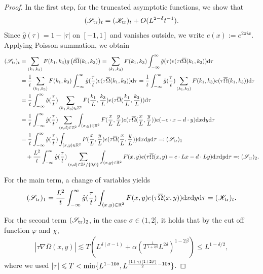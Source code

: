 \documentclass[UTF-8,reqno]{amsart}
\numberwithin{equation}{section}
\theoremstyle{definition}
\def\dif{{\mathord{{\rm d}}}}
\def\min{{\mathord{{\rm min}}}}
\def\leq{\leqslant}
\def\dif{{\mathord{{\rm d}}}}
\def\min{{\mathord{{\rm min}}}}
\def\leq{\leqslant}
\begin{document}
\begin{proof}
In the first step,  for  the truncated asymptotic functions, we show that $$
( \mathscr S_{\rm tr})_t= (\mathscr K_{\rm tr})_t +O(L^{2-\delta} t^{-1}).
$$
Since $\widehat g(\tau)=1-|\tau|$ on $[-1,1]$ and vanishes outside, we write $e(x):=e^{2\pi i x}$. Applying Poisson summation, we obtain 
\begin{align*}
 (  \mathscr S_{\rm tr})_t&=\sum_{(k_1, k_3)}F(k_1,k_3) g\left(t\overline \Omega(k_1,k_3)\right)=\sum_{(k_1, k_3)}F(k_1,k_3)\int_{-\infty}^{\infty}\hat{g}(\tau)e(\tau t\overline \Omega(k_1,k_3))\dif \tau\\
 &=\frac1t \sum_{(k_1, k_3)}F(k_1,k_3)\int_{-\infty}^{\infty}\hat{g}(\frac\tau t)e(\tau \overline \Omega(k_1,k_3))\dif \tau=\frac1t \int_{-\infty}^{\infty}\hat{g}(\frac\tau t)\sum_{(k_1, k_3)}F(k_1,k_3)e(\tau \overline \Omega(k_1,k_3))\dif \tau\\
 &=\frac1t \int_{-\infty}^{\infty}\hat{g}(\frac\tau t)\sum_{(k_1, k_3)\in\mathbb{Z}^{2}}F(\frac{k_1}{L},\frac{k_3}L)e(\tau \overline \Omega(\frac{k_1}L,\frac{k_3}L))\dif \tau\\
 &=\frac1t \int_{-\infty}^{\infty}\hat{g}(\frac\tau t) \sum_{(c,d)\in\mathbb{Z}^{2}}\int_{(x,y)\in\mathbb{R}^{2}}F(\frac{x}{L},\frac{y}L)e(\tau \overline \Omega(\frac{x}L,\frac{y}L))e(-c\cdot x-d\cdot y) \dif x\dif y\dif \tau\\
  &=\frac1t \int_{-\infty}^{\infty}\hat{g}(\frac\tau t) \int_{(x,y)\in\mathbb{R}^{2}}F(\frac{x}{L},\frac{y}L)e(\tau \overline \Omega(\frac{x}L,\frac{y}L))\dif x\dif y\dif \tau=:  (\mathscr S_{\rm tr})_1\\
   &\quad+\frac{L^{2}}t \int_{-\infty}^{\infty}\hat{g}(\frac\tau t) \sum_{(c,d)\in\mathbb{Z}^{2}/\{0,0\}}\int_{(x,y)\in\mathbb{R}^{2}}F(x,y)e(\tau \overline \Omega(x,y)-c\cdot Lx-d\cdot Ly) \dif x\dif y\dif \tau=:  (\mathscr S_{\rm tr})_2.
\end{align*}

For the main term, a change of variables yields
\begin{align*}
  ( \mathscr S_{\rm tr})_1=\frac{L^{2}}t \int_{-\infty}^{\infty}\hat{g}(\frac\tau t) \int_{(x,y)\in\mathbb{R}^{2}}F(x,y)e(\tau \overline \Omega(x,y))\dif x\dif y\dif \tau= (\mathscr K_{\rm tr})_t.
\end{align*}

For the second term $(\mathscr S_{\rm tr})_2$, in the case $\sigma\in(1,2]$, it holds that by the cut off function $\varphi$ and $\chi$,
\begin{align*}
   |\tau  \nabla  \overline \Omega(x,y)|\lesssim T(L^{\delta(\sigma-1)}+\alpha (T^{\frac{1}{1+2\beta}}L^{2\delta})^{1-2\beta})\leq L^{1-\delta/2},
\end{align*}
where we used $|\tau|\leq T < \min\{L^{1-10\delta},L^{\frac{(1+\gamma)(1+2\beta)}{2}-10\delta}\}$.


\end{proof}
\end{document}
